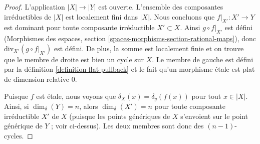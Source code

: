 \begin{proof}
L'application $|X| \to |Y|$ est ouverte. L'ensemble des composantes irréductibles
de $|X|$ est localement fini dans $|X|$. Nous concluons que $f|_{X'} : X' \to
Y$ est dominant pour toute composante irréductible $X' \subset X$. Ainsi $g
\circ f|_{X'}$ est défini (Morphismes des espaces, section
\ref{spaces-morphisms-section-rational-maps}), donc $\text{div}_{X'}(g \circ
f|_{X'})$ est défini. De plus, la somme est localement finie et on trouve que
le membre de droite est bien un cycle sur $X$. Le membre de gauche est défini par
la définition \ref{definition-flat-pullback} et le fait qu'un morphisme
\'etale est plat de dimension relative $0$.

\medskip\noindent
Puisque $f$ est \'etale, nous voyons que $\delta_X(x) = \delta_y(f(x))$ pour
tout $x \in |X|$. Ainsi, si $\dim_\delta(Y) = n$, alors $\dim_\delta(X') =
n$ pour toute composante irréductible $X'$ de $X$ (puisque les points
génériques de $X$ s'envoient sur le point générique de $Y$ ; voir ci-dessus).
Les deux membres sont donc des $(n - 1)$-cycles.


\end{proof}
